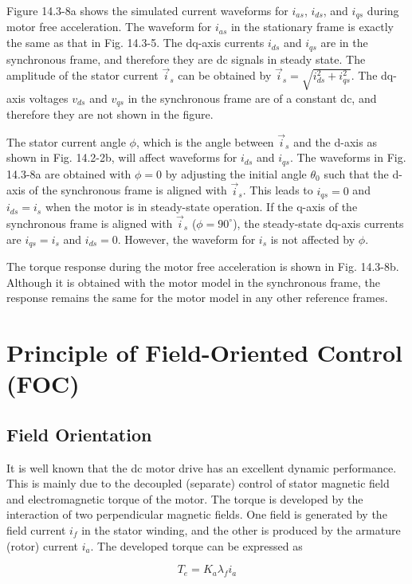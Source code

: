 \documentclass[letterpaper,12pt]{article}
\begin{document}
Figure 14.3-8a shows the simulated current waveforms for $i_{as}$, $i_{ds}$, and $i_{qs}$ during motor free acceleration. The waveform for $i_{as}$ in the stationary frame is exactly the same as that in Fig. 14.3-5. The dq-axis currents $i_{ds}$ and $i_{qs}$ are in the synchronous frame, and therefore they are dc signals in steady state. The amplitude of the stator current $\vec{i}_s$ can be obtained by $\vec{i}_s = \sqrt{i_{ds}^2 + i_{qs}^2}$. The dq-axis voltages $v_{ds}$ and $v_{qs}$ in the synchronous frame are of a constant dc, and therefore they are not shown in the figure.

The stator current angle $\phi$, which is the angle between $\vec{i}_s$ and the d-axis as shown in Fig. 14.2-2b, will affect waveforms for $i_{ds}$ and $i_{qs}$. The waveforms in Fig. 14.3-8a are obtained with $\phi = 0$ by adjusting the initial angle $\theta_0$ such that the d-axis of the synchronous frame is aligned with $\vec{i}_s$. This leads to $i_{qs} = 0$ and $i_{ds} = i_s$ when the motor is in steady-state operation. If the q-axis of the synchronous frame is aligned with $\vec{i}_s$ ($\phi = 90^\circ$), the steady-state dq-axis currents are $i_{qs} = i_s$ and $i_{ds} = 0$. However, the waveform for $i_s$ is not affected by $\phi$.

The torque response during the motor free acceleration is shown in Fig. 14.3-8b. Although it is obtained with the motor model in the synchronous frame, the response remains the same for the motor model in any other reference frames.

\clearpage
\section{Principle of Field-Oriented Control (FOC)}

\subsection{Field Orientation}

It is well known that the dc motor drive has an excellent dynamic performance. This is mainly due to the decoupled (separate) control of stator magnetic field and electromagnetic torque of the motor. The torque is developed by the interaction of two perpendicular magnetic fields. One field is generated by the field current $i_f$ in the stator winding, and the other is produced by the armature (rotor) current $i_a$. The developed torque can be expressed as

\begin{equation}
T_e = K_a \lambda_f i_a \tag{14.4-1}
\end{equation}
\end{document}

